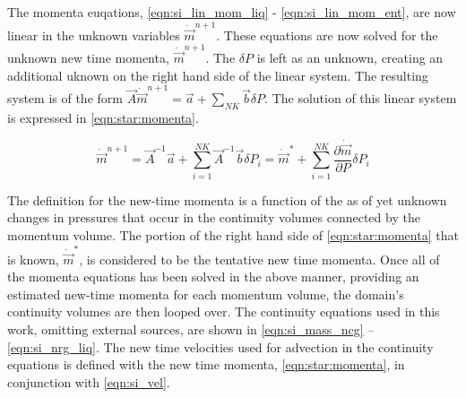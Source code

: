 The momenta euqations, \eqref{eqn:si_lin_mom_liq} - \eqref{eqn:si_lin_mom_ent}, are now linear in the unknown variables $\dot{\vec{m}}^{n+1}$.
These equations are now solved for the unknown new time momenta, $\dot{\vec{m}}^{n+1}$.
The $\delta P$ is left as an unknown, creating an additional uknown on the right hand side of the linear system.
The resulting system is of the form $\vec{A} \dot{\vec{m}}^{n+1} = \vec{a} + \sum_{NK} \vec{b} \delta P$.
The solution of this linear system is expressed in \eqref{eqn:star:momenta}.

\begin{equation}
\label{eqn:star:momenta}
\dot{\vec{m}}^{n+1} = \vec{A}^{-1} \vec{a} + \sum^{NK}_{i = 1} \vec{A}^{-1} \vec{b} \delta P_{i} = \dot{\vec{m}}^{*} + \sum^{NK}_{i = 1} \frac{\partial \dot{\vec{m}}}{\partial P} \delta P_{i}
\end{equation}

The definition for the new-time momenta is a function of the as of yet unknown changes in pressures that occur in the continuity volumes connected by the momentum volume.
The portion of the right hand side of \eqref{eqn:star:momenta} that is known, $\dot{\vec{m}}^{*}$, is considered to be the tentative new time momenta.
Once all of the momenta equations has been solved in the above manner, providing an estimated new-time momenta for each momentum volume, the domain's continuity volumes are then looped over.
The continuity equations used in this work, omitting external sources, are shown in \eqref{eqn:si_mass_ncg} -- \eqref{eqn:si_nrg_liq}. 
The new time velocities used for advection in the continuity equations is defined with the new time momenta, \eqref{eqn:star:momenta}, in conjunction with \eqref{eqn:si_vel}.

